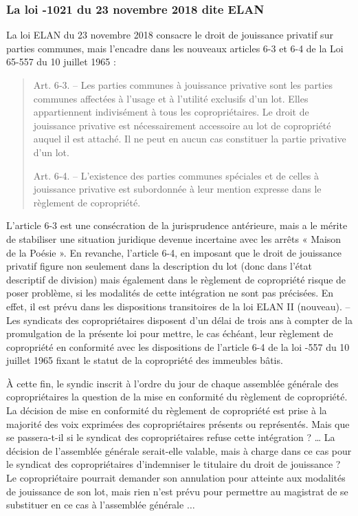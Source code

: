 		\subsubsection{La loi -1021 du 23 novembre 2018 dite ELAN}
		
			La loi ELAN du 23 novembre 2018 consacre le droit de jouissance privatif sur parties communes, mais
			l’encadre dans les nouveaux articles 6-3 et 6-4 de la Loi 65-557 du 10 juillet 1965 :
			\begin{quote}
				Art. 6‑3. – Les parties communes à jouissance privative sont les parties communes affectées
				à l’usage et à l’utilité exclusifs d’un lot. Elles appartiennent indivisément à tous les
				copropriétaires. Le droit de jouissance privative est nécessairement accessoire au lot de
				copropriété auquel il est attaché. Il ne peut en aucun cas constituer la partie privative d’un
				lot.
			
				Art. 6‑4. – L’existence des parties communes spéciales et de celles à jouissance privative
				est subordonnée à leur mention expresse dans le règlement de copropriété.
			\end{quote}
			
			L’article 6-3 est une consécration de la jurisprudence antérieure, mais a le mérite de stabiliser une situation
			juridique devenue incertaine avec les arrêts « Maison de la Poésie ».
			En revanche, l’article 6-4, en imposant que le droit de jouissance privatif figure non seulement dans la
			description du lot (donc dans l’état descriptif de division) mais également dans le règlement de copropriété
			risque de poser problème, si les modalités de cette intégration ne sont pas précisées.
			En effet, il est prévu dans les dispositions transitoires de la loi ELAN
			II (nouveau). – Les syndicats des copropriétaires disposent d’un délai de trois ans à compter de la
			promulgation de la présente loi pour mettre, le cas échéant, leur règlement de copropriété en conformité
			avec les dispositions de l’article 6-4 de la loi -557 du 10 juillet 1965 fixant le statut de la copropriété
			des immeubles bâtis.
			
			À cette fin, le syndic inscrit à l’ordre du jour de chaque assemblée générale des copropriétaires la question
			de la mise en conformité du règlement de copropriété. La décision de mise en conformité du règlement de
			copropriété est prise à la majorité des voix exprimées des copropriétaires présents ou représentés.
			Mais que se passera-t-il si le syndicat des copropriétaires refuse cette intégration ? … La décision de
			l’assemblée générale serait-elle valable, mais à charge dans ce cas pour le syndicat des copropriétaires
			d’indemniser le titulaire du droit de jouissance ? Le copropriétaire pourrait demander son annulation pour
			atteinte aux modalités de jouissance de son lot, mais rien n’est prévu pour permettre au magistrat de se
			substituer en ce cas à l’assemblée générale $\dots$
			
